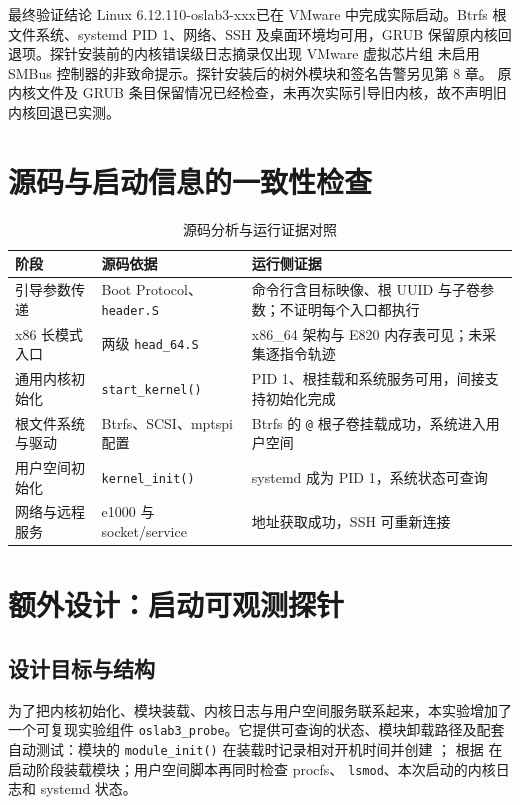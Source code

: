 \documentclass[UTF8,zihao=-4,openany,fontset=none]{ctexrep}
\newcommand{\kernelver}{6.12.110-oslab3-xxx}
\begin{document}
\begin{resultbox}{最终验证结论}
Linux \kernelver 已在 VMware 中完成实际启动。Btrfs 根文件系统、systemd PID 1、网络、SSH
及桌面环境均可用，GRUB 保留原内核回退项。探针安装前的内核错误级日志摘录仅出现 VMware 虚拟芯片组
未启用 SMBus 控制器的非致命提示。探针安装后的树外模块和签名告警另见第 8 章。
原内核文件及 GRUB 条目保留情况已经检查，未再次实际引导旧内核，故不声明旧内核回退已实测。
\end{resultbox}

\chapter{源码与启动信息的一致性检查}

\begin{table}[H]
  \centering
  \caption{源码分析与运行证据对照}
  \begin{tabularx}{\textwidth}{p{}p{}X}
    \toprule
    阶段 & 源码依据 & 运行侧证据 \\
    \midrule
    引导参数传递 & Boot Protocol、\texttt{header.S} & 命令行含目标映像、根 UUID 与子卷参数；不证明每个入口都执行 \\
    x86 长模式入口 & 两级 \texttt{head\_64.S} & x86\_64 架构与 E820 内存表可见；未采集逐指令轨迹 \\
    通用内核初始化 & \texttt{start\_kernel()} & PID 1、根挂载和系统服务可用，间接支持初始化完成 \\
    根文件系统与驱动 & Btrfs、SCSI、mptspi 配置 & Btrfs 的 \texttt{@} 根子卷挂载成功，系统进入用户空间 \\
    用户空间初始化 & \texttt{kernel\_init()} & systemd 成为 PID 1，系统状态可查询 \\
    网络与远程服务 & e1000 与 socket/service & 地址获取成功，SSH 可重新连接 \\
    \bottomrule
  \end{tabularx}
\end{table}

\chapter{额外设计：启动可观测探针}

\section{设计目标与结构}
为了把内核初始化、模块装载、内核日志与用户空间服务联系起来，本实验增加了一个可复现实验组件
\texttt{oslab3\_probe}。它提供可查询的状态、模块卸载路径及配套自动测试：模块的
\texttt{module\_init()} 在装载时记录相对开机时间并创建
； 根据
 在启动阶段装载模块；用户空间脚本再同时检查 procfs、
\texttt{lsmod}、本次启动的内核日志和 systemd 状态。
\end{document}
